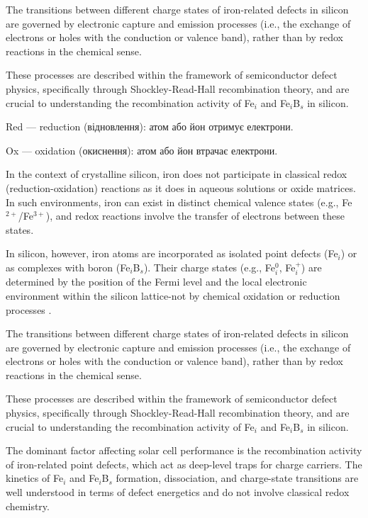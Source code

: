\documentclass[a4paper,fleqn]{cas-sc}
\begin{document}
The transitions between different charge states of iron-related defects in silicon are governed by electronic capture and emission processes 
(i.e., the exchange of electrons or holes with the conduction or valence band), rather than by redox reactions in the chemical sense.


These processes are described within the framework of semiconductor defect physics, specifically through Shockley-Read-Hall recombination theory, and are crucial to understanding the recombination activity of Fe$_i$ and Fe$_i$B$_s$ in silicon.

Red — reduction (відновлення): атом або йон отримує електрони.

Ox — oxidation (окиснення): атом або йон втрачає електрони.


In the context of crystalline silicon, iron does not participate in classical redox (reduction-oxidation) reactions as it does in aqueous solutions or oxide matrices.
In such environments, iron can exist in distinct chemical valence states (e.g., Fe$^{2+}$/Fe$^{3+}$), and redox reactions involve the transfer of electrons between these states.


In silicon, however, iron atoms are incorporated as isolated point defects (Fe$_i$) or as complexes with boron (Fe$_i$B$_s$).
Their charge states (e.g., Fe$_i^0$, Fe$_i^+$) are determined by the position of the Fermi level and the local electronic environment within the silicon lattice-not by chemical oxidation or reduction processes \cite{weber1983}.


The transitions between different charge states of iron-related defects in silicon are governed by electronic capture and emission processes (i.e., the exchange of electrons or holes with the conduction or valence band), rather than by redox reactions in the chemical sense.


These processes are described within the framework of semiconductor defect physics, specifically through Shockley-Read-Hall recombination theory, and are crucial to understanding the recombination activity of Fe$_i$ and Fe$_i$B$_s$ in silicon.


The dominant factor affecting solar cell performance is the recombination activity of iron-related point defects, which act as deep-level traps for charge carriers.
The kinetics of Fe$_i$ and Fe$_i$B$_s$ formation, dissociation, and charge-state transitions are well understood in terms of defect energetics and do not involve classical redox chemistry.
\end{document}

